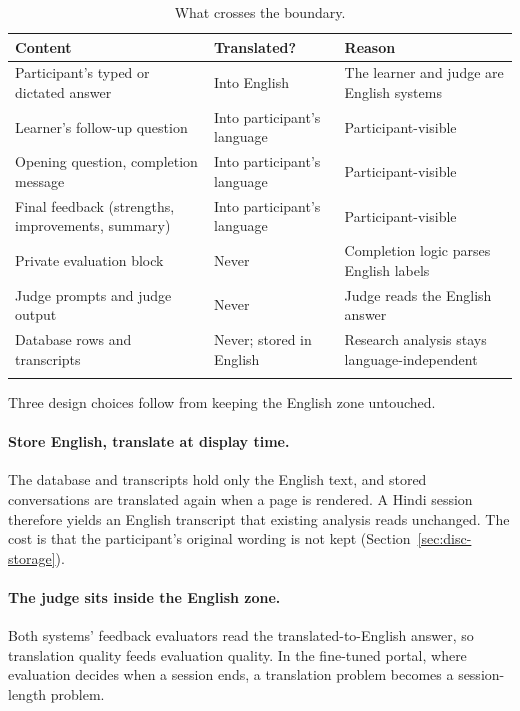 \documentclass[pdflatex,sn-mathphys-num]{sn-jnl}%
\theoremstyle{thmstyleone}%
\theoremstyle{thmstyletwo}%
\theoremstyle{thmstylethree}%
\begin{document}
\begin{table}[t]
\caption{What crosses the boundary.}\label{tab:crosses}
\footnotesize
\begin{tabular*}{\textwidth}{@{\extracolsep\fill}p{}p{}p{}}
\toprule
Content & Translated? & Reason \\
\midrule
Participant's typed or dictated answer & Into English & The learner and judge are English systems \\
Learner's follow-up question & Into participant's language & Participant-visible \\
Opening question, completion message & Into participant's language & Participant-visible \\
Final feedback (strengths, improvements, summary) & Into participant's language & Participant-visible \\
Private evaluation block & Never & Completion logic parses English labels \\
Judge prompts and judge output & Never & Judge reads the English answer \\
Database rows and transcripts & Never; stored in English & Research analysis stays language-independent \\
\botrule
\end{tabular*}
\end{table}

Three design choices follow from keeping the English zone untouched.

\paragraph{Store English, translate at display time.} The database and transcripts hold only the
English text, and stored conversations are translated again when a page is rendered. A Hindi session
therefore yields an English transcript that existing analysis reads unchanged. The cost is that the
participant's original wording is not kept (Section~\ref{sec:disc-storage}).

\paragraph{The judge sits inside the English zone.} Both systems' feedback evaluators read the
translated-to-English answer, so translation quality feeds evaluation quality. In the fine-tuned
portal, where evaluation decides when a session ends, a translation problem becomes a session-length
problem.
\end{document}
